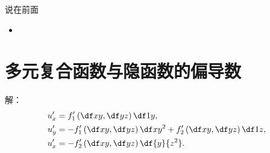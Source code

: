 
\titlepage

\begin{frame}{说在前面}
	\linespread{1.5}
	  \begin{itemize}[<+-|alert@+>]
	    \item {}
	  \end{itemize}
\end{frame}


\section{多元复合函数与隐函数的偏导数}

\begin{frame}
	\linespread{1.5}
	
	\bigskip
	
	\small 解：\it
	\begin{align*}
		u'_x&=f'_1\left(\df xy,\df yz\right)\df1y,\\
		u'_y&=-f'_1\left(\df xy,\df yz\right)\df x{y^2}
		+f'_2\left(\df xy,\df yz\right)\df1z,\\
		u'_x&=-f'_2\left(\df xy,\df yz\right)\df{y}{z^2}.
	\end{align*}
	\fin
\end{frame}

